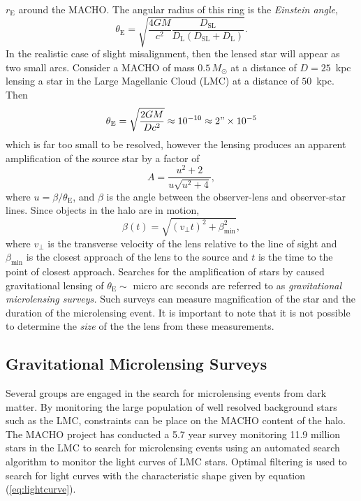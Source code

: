 $r_\mathrm{E}$ around the MACHO. The angular radius of this ring is the
\emph{Einstein angle},
\begin{equation}
\theta_\mathrm{E} = \sqrt{\frac{4GM}{c^2} \frac{D_\mathrm{SL}}
{D_\mathrm{L}\left(D_\mathrm{SL} + D_\mathrm{L}\right)}}.
\end{equation}
In the realistic case of slight misalignment, then the lensed star will appear
as two small arcs. Consider a MACHO of mass $0.5\,M_\odot$ at a distance of $D
= 25$~kpc lensing a star in the Large Magellanic Cloud (LMC) at a distance of
$50$~kpc. Then
\begin{equation}
\theta_\mathrm{E} = \sqrt{\frac{2GM}{Dc^2}} \approx 10^{-10} \approx 2" \times
10^{-5}
\end{equation}
which is far too small to be resolved, however the lensing produces an
apparent amplification of the source star by a factor
of\cite{1964MNRAS.128..295R}
\begin{equation}
A = \frac{u^2 + 2}{u\sqrt{u^2 + 4}},
\label{eq:lightcurve}
\end{equation}
where $u = \beta / \theta_\mathrm{E}$, and $\beta$ is the angle between the
observer-lens and observer-star lines. Since objects in the halo are in
motion,
\begin{equation}
\beta(t) = \sqrt{ (v_\perp t)^2 + \beta_\mathrm{min}^2 },
\end{equation}
where $v_\perp$ is the transverse velocity of the lens relative to the 
line of sight and $\beta_\mathrm{min}$ is the closest approach of the lens to
the source and $t$ is the time to the point of closest
approach\cite{Paczynski:1985jf,Griest:1990vu}. 
Searches for the amplification of stars by caused gravitational lensing of
$\theta_\mathrm{E} \sim $ micro arc seconds are referred to as
\emph{gravitational microlensing surveys.} Such surveys can measure
magnification of the star and the duration of the microlensing event. It is
important to note that it is not possible to determine the \emph{size} of the
the lens from these measurements.

\subsection{Gravitational Microlensing Surveys}

Several groups are engaged in the search for microlensing events from dark
matter\cite{Alcock:2000ph,Afonso:2002xq}. By monitoring the large population of
well resolved background stars such as the LMC, constraints can be place on the
MACHO content of the halo. The MACHO project has conducted a 5.7 year survey
monitoring 11.9 million stars in the LMC to search for microlensing
events\cite{Alcock:2000ph} using an automated search algorithm to monitor the
light curves of LMC stars. Optimal filtering is used to search for light curves
with the characteristic shape given by equation (\ref{eq:lightcurve}).

